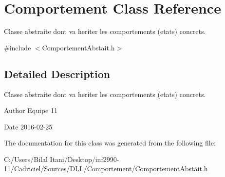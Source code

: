\hypertarget{class_comportement}{}\section{Comportement Class Reference}
\label{class_comportement}


Classe abstraite dont va heriter les comportements (etats) concrets.  




{\ttfamily \#include $<$Comportement\+Abstait.\+h$>$}



\subsection{Detailed Description}
Classe abstraite dont va heriter les comportements (etats) concrets. 

\begin{DoxyAuthor}{Author}
Equipe 11 
\end{DoxyAuthor}
\begin{DoxyDate}{Date}
2016-\/02-\/25 
\end{DoxyDate}


The documentation for this class was generated from the following file\+:\begin{DoxyCompactItemize}
\item 
C\+:/\+Users/\+Bilal Itani/\+Desktop/inf2990-\/11/\+Cadriciel/\+Sources/\+D\+L\+L/\+Comportement/Comportement\+Abstait.\+h\end{DoxyCompactItemize}
